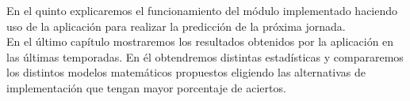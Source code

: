 En el quinto explicaremos el funcionamiento del módulo implementado haciendo uso de la aplicación para realizar la predicción de la próxima jornada.\\

En el último capítulo mostraremos los resultados obtenidos por la aplicación en las últimas temporadas. En él obtendremos distintas estadísticas y compararemos los distintos modelos matemáticos propuestos eligiendo las alternativas de implementación que tengan mayor porcentaje de aciertos.\\

